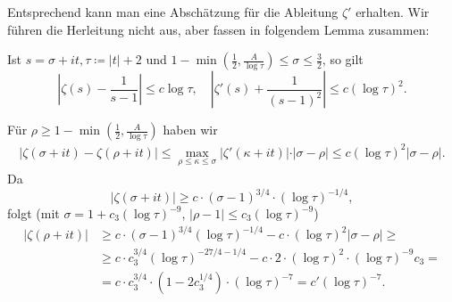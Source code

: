 Entsprechend kann man eine Abschätzung für die Ableitung $\zeta'$ erhalten. Wir führen die Herleitung nicht aus, aber fassen in folgendem Lemma zusammen:

\begin{lemma}
    Ist $s = \sigma + it, \tau \coloneqq \vert t \vert + 2$ und $1 - \min \left( \frac{1}{2}, \frac{A}{\log \tau} \right) \leq \sigma \leq \frac{3}{2}$, so gilt
    $$ \left\vert \zeta(s) - \frac{1}{s-1} \right\vert \leq c \log \tau, \quad \left\vert \zeta'(s) + \frac{1}{(s-1)^2} \right\vert \leq c (\log \tau)^2. $$
\end{lemma}

\begin{remark}
    Für $\rho \geq 1 - \min \left( \frac{1}{2}, \frac{A}{\log \tau} \right)$ haben wir
    \begin{align*}
        \vert \zeta(\sigma + it) - \zeta(\rho + it) \vert \leq \max_{\rho \leq \kappa \leq \sigma} \vert \zeta'(\kappa + it) \vert \cdot \vert \sigma - \rho \vert \leq c (\log \tau)^2 \vert \sigma - \rho \vert.
    \end{align*}
    Da
    $$ \vert \zeta(\sigma + it) \vert \geq c \cdot (\sigma - 1)^{3/4} \cdot (\log \tau)^{-1/4}, $$
    folgt (mit $\sigma = 1 + c_3 (\log \tau)^{-9}$, $\vert \rho - 1 \vert \leq c_3 (\log \tau)^{-9}$)
    \begin{align*}
        \vert \zeta(\rho + it) \vert &\geq c \cdot (\sigma - 1)^{3/4} (\log \tau)^{-1/4} - c \cdot (\log \tau)^2 \vert \sigma - \rho \vert \geq \\
        &\geq c \cdot c_3^{3/4} (\log \tau)^{-27/4 - 1/4} - c \cdot 2 \cdot (\log \tau)^2 \cdot (\log \tau)^{-9} c_3 = \\
        &= c \cdot c_3^{3/4} \cdot (1 - 2c_3^{1/4}) \cdot (\log \tau)^{-7} = c' (\log \tau)^{-7}.
    \end{align*}
\end{remark}

